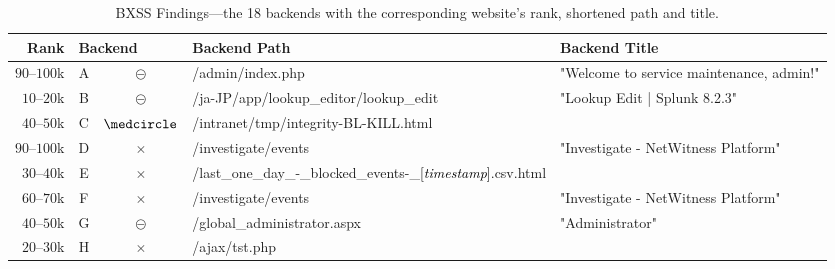 \newcommand\mydots{\ifmmode\ldots\else\thinspace\makebox[1em][c]{.\hfil.\hfil.}\thinspace\fi}
\newcommand{\short}[0]{\textcolor{black}{[\mydots]}}
\newcommand{\timestamp}[0]{\textcolor{black}{[\emph{timestamp}]}}
\newcommand{\toolname}[0]{\textcolor{black}{[\emph{tool}]}}
\newcommand{\sitename}[0]{\textcolor{black}{[\emph{site}]}}

\newcommand{\publicdomain}[0]{$\medcircle$} %
\newcommand{\publiclockeddomain}[0]{$\circleddash$} %
\newcommand{\privatedomain}[0]{$\times$} %

\newcommand\Tstrut{\rule{0pt}{2.6ex}}   %
\newcommand\Bstrut{\rule{0pt}{2.6ex}}   %

\newcommand{\backenduri}[1]{{{#1}}}
\newcommand{\backendsymbol}[1]{{\uppercase{#1}}}

\begin{table*}[htb]
	\centering
	\tablesize
	\begin{threeparttable}
		\caption{BXSS Findings---the \num{18} backends with the corresponding website's rank, shortened path and title.}\label{tab:bxss-findings}
		\begin{tabularx}{\textwidth}{r|cclX}
			\toprule
			\textbf{Rank} & \multicolumn{2}{l}{\textbf{Backend}} & \textbf{Backend Path} & \textbf{Backend Title} \\
			\midrule
			$90$--$100$k & \backendsymbol{a} & {\publiclockeddomain} & \backenduri{/admin/index.php} & \tnote{*}"Welcome to service maintenance, admin!"\\
			$10$--$20$k & \backendsymbol{b} & {\publiclockeddomain} & \backenduri{/ja-JP/app/lookup\_editor/lookup\_edit} & "Lookup Edit | Splunk 8.2.3"\\
			$40$--$50$k & \backendsymbol{c} & {\publicdomain} & \backenduri{/intranet/tmp/integrity-BL-KILL.html} &\\
			$90$--$100$k & \backendsymbol{d} & {\privatedomain} & \backenduri{/investigate/events} & "Investigate - NetWitness Platform"\\
			$30$--$40$k & \backendsymbol{e} & {\privatedomain} & \backenduri{/last\_one\_day\_-\_blocked\_events-\_\timestamp{}.csv.html} &\\
			$60$--$70$k & \backendsymbol{f} & {\privatedomain} & \backenduri{/investigate/events} & "Investigate - NetWitness Platform"\\
			$40$--$50$k & \backendsymbol{g} & {\publiclockeddomain} & \backenduri{/global\_administrator.aspx} & "Administrator"\\
			$20$--$30$k & \backendsymbol{h} & {\privatedomain} & \backenduri{/ajax/tst.php} &\\

\end{tabularx}
\end{threeparttable}
\end{table*}
